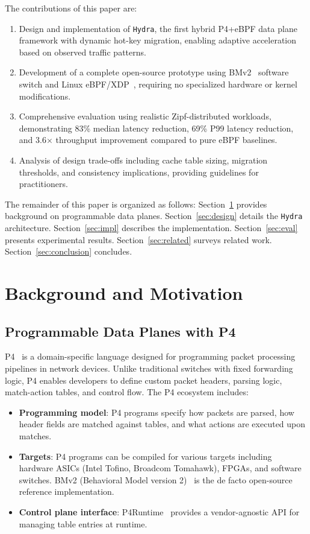 \documentclass[sigconf,anonymous,10pt]{acmart}
\newcommand{\hydra}{\texttt{Hydra}}
\begin{document}
The contributions of this paper are:

\begin{enumerate}
    \item Design and implementation of \hydra{}, the first hybrid P4+eBPF data plane framework with dynamic hot-key migration, enabling adaptive acceleration based on observed traffic patterns.
    
    \item Development of a complete open-source prototype using BMv2~\cite{bmv2} software switch and Linux eBPF/XDP~\cite{xdp}, requiring no specialized hardware or kernel modifications.
    
    \item Comprehensive evaluation using realistic Zipf-distributed workloads, demonstrating 83\% median latency reduction, 69\% P99 latency reduction, and 3.6$\times$ throughput improvement compared to pure eBPF baselines.
    
    \item Analysis of design trade-offs including cache table sizing, migration thresholds, and consistency implications, providing guidelines for practitioners.
\end{enumerate}

The remainder of this paper is organized as follows: Section~\ref{sec:bg} provides background on programmable data planes. Section~\ref{sec:design} details the \hydra{} architecture. Section~\ref{sec:impl} describes the implementation. Section~\ref{sec:eval} presents experimental results. Section~\ref{sec:related} surveys related work. Section~\ref{sec:conclusion} concludes.

\section{Background and Motivation}
\label{sec:bg}

\subsection{Programmable Data Planes with P4}
P4~\cite{p4} is a domain-specific language designed for programming packet processing pipelines in network devices. Unlike traditional switches with fixed forwarding logic, P4 enables developers to define custom packet headers, parsing logic, match-action tables, and control flow. The P4 ecosystem includes:

\begin{itemize}
    \item \textbf{Programming model}: P4 programs specify how packets are parsed, how header fields are matched against tables, and what actions are executed upon matches.
    \item \textbf{Targets}: P4 programs can be compiled for various targets including hardware ASICs (Intel Tofino, Broadcom Tomahawk), FPGAs, and software switches. BMv2 (Behavioral Model version 2)~\cite{bmv2} is the de facto open-source reference implementation.
    \item \textbf{Control plane interface}: P4Runtime~\cite{p4runtime} provides a vendor-agnostic API for managing table entries at runtime.
\end{itemize}
\end{document}
